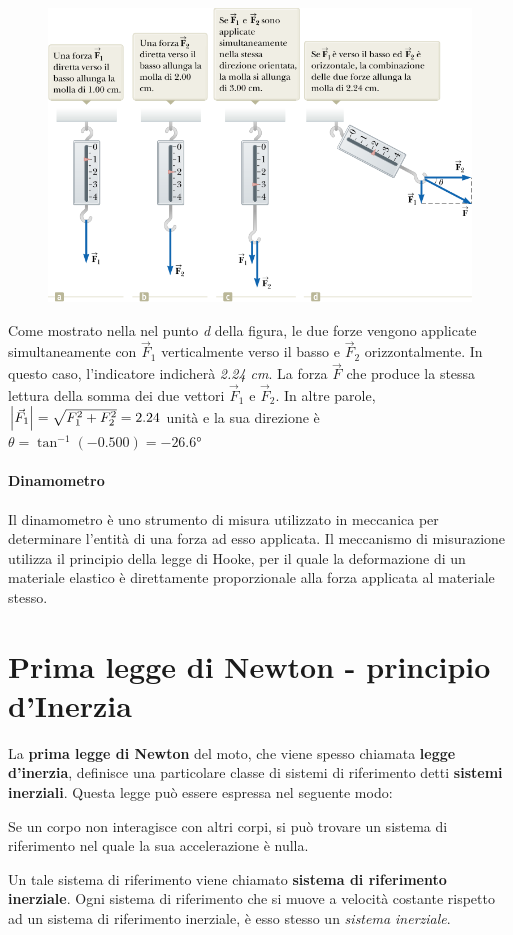 \documentclass[a4paper,11pt,oneside]{book}
\begin{document}
\newpage
\begin{figure}[h]
    \centering
    \includegraphics[scale=0.5]{natura_vettoriale_forze}
\end{figure}
Come mostrato nella nel punto \emph{d} della figura, le due forze vengono applicate simultaneamente con $\vec{F}_1$ verticalmente verso
il basso e $\vec{F}_2$ orizzontalmente. In questo caso, l’indicatore indicherà \emph{2.24 cm}. La forza $\vec{F}$ che produce
la stessa lettura della somma dei due vettori $\vec{F}_1$ e $\vec{F}_2$. In altre parole, $\abs{\vec{F}_1} = \sqrt{F_1^2 + F_2^2} = 2.24$
unità e la sua direzione è $\theta = \tan^{-1} (-0.500) = -26.6$°

\paragraph{Dinamometro}
Il dinamometro è uno strumento di misura utilizzato in meccanica per determinare l'entità di una forza ad esso applicata.
Il meccanismo di misurazione utilizza il principio della legge di Hooke, per il quale la deformazione di un materiale elastico è direttamente proporzionale alla forza applicata al materiale stesso.

\newpage
\section{Prima legge di Newton - principio d'Inerzia}
La \textbf{prima legge di Newton} del moto, che viene spesso chiamata \textbf{legge d’inerzia},
definisce una particolare classe di sistemi di riferimento detti \textbf{sistemi inerziali}.
Questa legge può essere espressa nel seguente modo:
\begin{displayquote}
    \centering
    Se un corpo non interagisce con altri corpi, si può trovare un sistema di riferimento nel quale la sua accelerazione è nulla.
\end{displayquote}
Un tale sistema di riferimento viene chiamato \textbf{sistema di riferimento inerziale}.
Ogni sistema di riferimento che si muove a velocità costante rispetto ad un sistema di riferimento inerziale, è esso stesso un \emph{sistema inerziale}.
\end{document}

